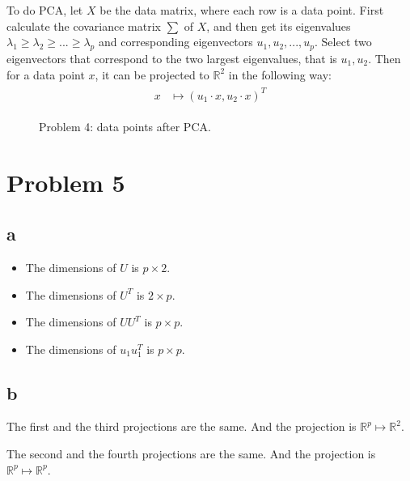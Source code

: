 \documentclass[a4paper,11pt]{article}
\theoremstyle{mytheor}
\begin{document}
To do PCA, let $X$ be the data matrix, where each row is a 
data point. First calculate the covariance matrix $\sum$ of $X$, and then get its eigenvalues $\lambda_1 \geq \lambda_2 \geq ... \geq \lambda_p$ and corresponding 
eigenvectors $u_1, u_2,...,u_p$. Select two eigenvectors that correspond to the two largest
eigenvalues, that is $u_1, u_2$. Then for a data point $x$, it can be projected to 
$\mathbb{R}^2$ in the following way:
\begin{align}
    \begin{split}
    x & \mapsto (u_1 \cdot x, u_2 \cdot x)^T
    \end{split}
\end{align}

\begin{figure}
    \caption{Problem 4: data points after PCA.}
    \label{fig:4}
\end{figure}

\section*{Problem 5}

\subsection*{a}
\begin{itemize}
    \item The dimensions of $U$ is $p \times 2$.
     \item The dimensions of $U^T$ is $2 \times p$.
     \item The dimensions of $UU^T$ is $p \times p$.
     \item The dimensions of $u_1 u_1^T$ is $p \times p$.
\end{itemize}

\subsection*{b}
The first and the third projections are the same. And the projection is
$\mathbb{R}^p \mapsto \mathbb{R}^{2}$.

The second and the fourth projections are the same. And the projection is 
$\mathbb{R}^p \mapsto \mathbb{R}^p$.
\end{document}

